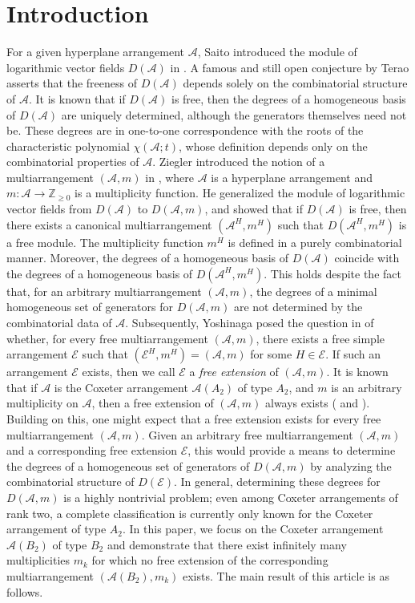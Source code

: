 \documentclass[12pt]{amsart}
\theoremstyle{definition}
\theoremstyle{remark}
\newcommand\CA{{\mathscr A}}
\newcommand\CE{{\mathscr E}}
\newcommand\ZZ{{\mathbb Z}}
\begin{document}
\section{Introduction}
For a given hyperplane arrangement $\CA$, Saito introduced the module of logarithmic vector fields $D(\CA)$ in \cite{MR0586450}. A famous and still open conjecture by Terao asserts that the freeness of $D(\CA)$ depends solely on the combinatorial structure of $\CA$. It is known that if $D(\CA)$ is free, then the degrees of a homogeneous basis of $D(\CA)$ are uniquely determined, although the generators themselves need not be. These degrees are in one-to-one correspondence with the roots of the characteristic polynomial $\chi(\CA;t)$, whose definition depends only on the combinatorial properties of $\CA$. Ziegler introduced the notion of a multiarrangement $(\CA, m)$ in \cite{MR1000610}, where $\CA$ is a hyperplane arrangement and $m: \CA \to \ZZ_{\geq 0}$ is a multiplicity function. He generalized the module of logarithmic vector fields from $D(\CA)$ to $D(\CA,m)$, and showed that if $D(\CA)$ is free, then there exists a canonical multiarrangement $(\CA^H, m^H)$ such that $D(\CA^H, m^H)$ is a free module. The multiplicity function $m^H$ is defined in a purely combinatorial manner. Moreover, the degrees of a homogeneous basis of $D(\CA)$ coincide with the degrees of a homogeneous basis of $D(\CA^H,m^H)$. This holds despite the fact that, for an arbitrary multiarrangement $(\CA,m)$, the degrees of a minimal homogeneous set of generators for $D(\CA,m)$ are not determined by the combinatorial data of $\CA$. Subsequently, Yoshinaga posed the question in \cite{MR3025868} of whether, for every free multiarrangement $(\CA, m)$, there exists a free simple arrangement $\CE$ such that $(\CE^H,m^H)=(\CA, m)$ for some $H\in\CE$. If such an arrangement $\CE$ exists, then we call $\CE$ a \emph{free extension} of $(\CA, m)$. It is known that if $\CA$ is the Coxeter arrangement $\CA(A_2)$ of type $A_2$, and $m$ is an arbitrary multiplicity on $\CA$, then a free extension of $(\CA, m)$ always exists (\cite[Thm.~2.5]{MR3025868} and \cite[Lem.~5.8]{2406.19866}). 
Building on this, one might expect that a free extension exists for every free multiarrangement $(\CA, m)$. Given an arbitrary free multiarrangement $(\CA,m)$ and a corresponding free extension $\CE$, this would provide a means to determine the degrees of a homogeneous set of generators of $D(\CA,m)$ by analyzing the combinatorial structure of $D(\CE)$. In general, determining these degrees for $D(\CA,m)$ is a highly nontrivial problem; even among Coxeter arrangements of rank two, a complete classification is currently only known for the Coxeter arrangement of type $A_2$. In this paper, we focus on the Coxeter arrangement $\CA(B_2)$ of type $B_2$ and demonstrate that there exist infinitely many multiplicities $m_k$ for which no free extension of the corresponding multiarrangement $(\CA(B_2), m_k)$ exists. The main result of this article is as follows.
\end{document}
